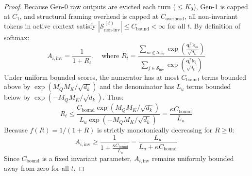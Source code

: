 \documentclass[11pt,a4paper]{article}
\begin{document}
\begin{proof}
Because Gen-0 raw outputs are evicted each turn ($\le K_0$), Gen-1 is capped at $C_1$, and structural framing overhead is capped at $C_{\text{overhead}}$, all non-invariant tokens in active context satisfy $|\mathcal{S}_{\text{non-inv}}^{(t)}| \le C_{\text{bound}} < \infty$ for all $t$. By definition of softmax:
\begin{equation}
    A_{i, \text{inv}} = \frac{1}{1 + R_t}, \quad \text{where } R_t = \frac{\sum_{m \notin \mathcal{S}_{\text{inv}}} \exp\left(\frac{\mathbf{q}_i^\top \mathbf{k}_m}{\sqrt{d_k}}\right)}{\sum_{j \in \mathcal{S}_{\text{inv}}} \exp\left(\frac{\mathbf{q}_i^\top \mathbf{k}_j}{\sqrt{d_k}}\right)}
\end{equation}
Under uniform bounded scores, the numerator has at most $C_{\text{bound}}$ terms bounded above by $\exp(M_Q M_K / \sqrt{d_k})$ and the denominator has $L_u$ terms bounded below by $\exp(-M_Q M_K / \sqrt{d_k})$. Thus:
\begin{equation}
    R_t \le \frac{C_{\text{bound}} \exp(M_Q M_K / \sqrt{d_k})}{L_u \exp(-M_Q M_K / \sqrt{d_k})} = \frac{\kappa C_{\text{bound}}}{L_u}
\end{equation}
Because $f(R) = 1/(1+R)$ is strictly monotonically decreasing for $R \ge 0$:
\begin{equation}
    A_{i, \text{inv}} \ge \frac{1}{1 + \frac{\kappa C_{\text{bound}}}{L_u}} = \frac{L_u}{L_u + \kappa C_{\text{bound}}}
\end{equation}
Since $C_{\text{bound}}$ is a fixed invariant parameter, $A_{i, \text{inv}}$ remains uniformly bounded away from zero for all $t$.
\end{proof}
\end{document}
